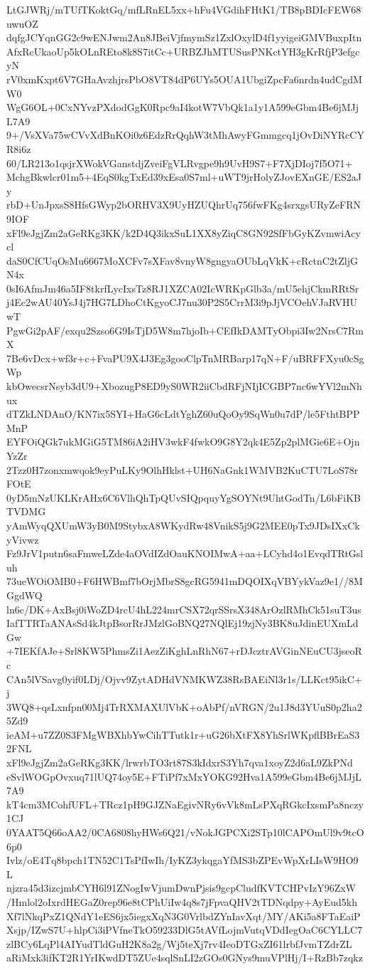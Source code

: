 LtGJWRj/mTUfTKoktGq/mfLRnEL5xx+hFu4VGdihFHtK1/TB8pBDIcFEW68uwuOZ
dqfgJCYqnGG2c9wENJwm2An8JBeiVjfmymSz1ZxlOxylD4f1yyigeiGMVBuxpItn
AfxRcUkaoUp5kOLnREto8k8S7itCc+URBZJhMTUSusPNKctYH3gKrRfjP3efgcyN
rV0xmKxpt6V7GHaAvzhjrsPbO8VT84dP6UYs5OUA1UbgiZpcFa6nrdn4udCgdMW0
WgG6OL+0CxNYvzPXdodGgK0Rpc9aI4kotW7VbQk1a1y1A599eGbm4Be6jMJjL7A9
9+/VsXVa75wCVvXdBnKOi0z6EdzRrQqhW3tMhAwyFGmmgcq1jOvDiNYRcCYR8i6z
60/LR213o1qsjrXWokVGanstdjZveiFgVLRvgpe9h9UvH9S7+F7XjDIoj7f5O71+
MchgBkwlcr01m5+4EqS0kgTxEd39xEsa0S7ml+uWT9jrHolyZJovEXnGE/ES2aJy
rbD+UnJpxsS8HfsGWyp2bORHV3X9UyHZUQhrUq756fwFKg4srxgsURyZeFRN9IOF
xFl9eJgjZm2aGeRKg3KK/k2D4Q3ikxSuL1XX8yZiqC8GN92SfFbGyKZvmwiAcycl
daS0CfCUqOsMu6667MoXCFv7sXFav8vnyW8gngyaOUbLqVkK+cRctnC2tZljGN4x
0sI6AfmJm46a5IF8tkrfLycIxsTz8RJ1XZCA02IcWRKpGlb3a/mU5ehjCkmRRtSr
j4Ec2wAU40YsJ4j7HG7LDhoCtKgyoCJ7nu30P2S5CrrM3i9pJjVCOehVJaRVHUwT
PgwGi2pAF/exqu2Szso6G9IsTjD5W8m7hjoIb+CEfIkDAMTyObpi3Iw2NrsC7RmX
7Be6vDcx+wf3r+c+FvaPU9X4J3Eg3gooClpTnMRBarp17qN+F/uBRFFXyu0cSgWp
kbOwecsrNsyb3dU9+XbozugP8ED9yS0WR2iiCbdRFjNIjICGBP7nc6wYVl2mNhux
dTZkLNDAnO/KN7ix5SYI+HaG6cLdtYghZ60uQoOy9SqWn0u7dP/le5FthtBPPMnP
EYFOiQGk7ukMGiG5TM86iA2iHV3wkF4fwkO9G8Y2qk4E5Zp2plMGie6E+OjnYzZr
2Tzz0H7zonxmwqok9eyPuLKy9OlhHklst+UH6NaGnk1WMVB2KuCTU7LoS78rFOtE
0yD5mNzUKLKrAHx6C6VlhQhTpQUvSIQpquyYgSOYNt9UhtGodTn/L6bFiKBTVDMG
yAmWyqQXUmW3yB0M9StybxA8WKydRw48VnikS5j9G2MEE0pTx9JDsIXxCkyVivwz
Fz9JrV1putn6saFmweLZde4aOVdIZdOauKNOIMwA+aa+LCyhd4o1EvqdTRtGsluh
73ueWOiOMB0+F6HWBmf7bOrjMbrS8gcRG5941mDQOIXqVBYykVaz9e1//8MGgdWQ
ln6c/DK+AxBsj0iWoZD4rcU4hL224mrCSX72qrSSrsX348ArOzlRMhCk51suT3us
IafTTRTaANAsSd4kJtpBsorRrJMzlGoBNQ27NQlEj19zjNy3BK8uJdinEUXmLdGw
+7IEKfAJe+Srl8KW5PhmsZi1AezZiKghLnRhN67+rDJcztrAVGinNEuCU3jseoRc
CAn5lVSavg0yif0LDj/Ojvv9ZytADHdVNMKWZ38RsBAEiNl3r1s/LLKct95ikC+j
3WQ8+qsLxnfpn00Mj4TrRXMAXUlVbK+oAbPf/nVRGN/2u1J8d3YUuS0p2ha25Zd9
ieAM+u7ZZ0S3FMgWBXhbYwCihTTutk1r+uG26bXtFX8YhSrlWKpflBBrEaS32FNL
xFl9eJgjZm2aGeRKg3KK/lrwrbTO3rt87S3kIdxrS3Yh7qva1xoyZ2d6aL9ZkPNd
eSvlWOGpOvxuq71lUQ74oy5E+FTiPf7xMxYOKG92Hva1A599eGbm4Be6jMJjL7A9
kT4cm3MCohfUFL+TRcz1pH9GJZNaEgivNRy6vVk8mLsPXqRGkcIxsmPa8nczy1CJ
0YAAT5Q66oAA2/0CA6808hyHWs6Q21/vNokJGPCXi2STp10lCAPOmUl9v9tcO6p0
Ivlz/oE4Tq8bpch1TN52C1TsPfIwIh/IyKZ3ykqgaYfMS3bZPEvWpXrLIsW9HO9L
njzra45d3izcjmbCYH6l91ZNogIwVjumDwnPjsis9gcpCludfKVTCHPvIzY96ZxW
/Hmlol2oIxrdHEGaZ0rep96e8tCPhUiIw4q8s7jFpvaQHV2tTDNqdpy+AyEud5kh
Xf7lNkqPxZ1QNdY1eES6jx5iegxXqN3G0VrlbdZYnIavXqt/MY/AKi5a8FTaEaiP
Xsjp/IZwS7U+hlpCi3iPVfneTkO59233DlG5tAVfLojmVutqVDdIegOaC6CYLLC7
zlBCy6LqPl4AIYudTldGuH2K8a2g/Wj5teXj7rv4IeoDTGxZI61lrbfJvmTZdrZL
aRiMxk3ifKT2R1YrIKwdDT5ZUe4sqlSnLI2zGOs0GNys9muVPlHj/I+RzBb7zqkz
